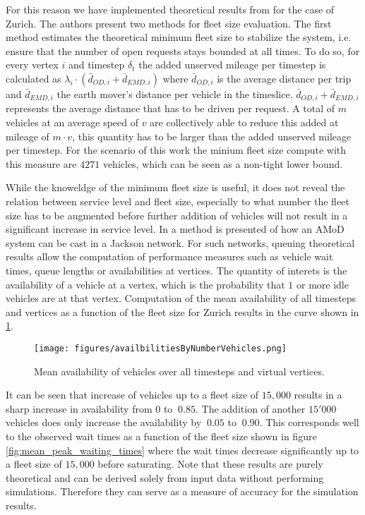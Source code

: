 For this reason we have implemented theoretical results from \citep{spieser2014toward} for the case of Zurich. The authors present two methods for fleet size evaluation. The first method estimates the theoretical minimum fleet size to stabilize the system, i.e. ensure that the number of open requests stays bounded at all times. To do so, for every vertex $i$ and timestep $\delta_t$ the added unserved mileage per timestep is calculated as $\lambda_i \cdot ( \bar{d}_{OD,i}  + \bar{d}_{EMD,i})$ where $\bar{d}_{OD,i}$ is the average distance per trip and  $\bar{d}_{EMD,i}$ the earth mover's distance per vehicle in the timeslice. $\bar{d}_{OD,i}  + \bar{d}_{EMD,i}$ represents the average distance that has to be driven per request. A total of $m$ vehicles at an average speed of $v$ are collectively able to reduce this added at mileage of $m \cdot v$, this quantity has to be larger than the added unserved mileage per timestep. For the scenario of this work the minium fleet size compute with this measure are $4271$ vehicles, which can be seen as a non-tight lower bound. 

While the knoweldge of the minimum fleet size is useful, it does not reveal the relation between service level and fleet size, especially to what number the fleet size has to be augmented before further addition of vehicles will not result in a significant increase in service level. In \citep{zhang2016control} a method is presented of how an AMoD system can be cast in a Jackson network. For such networks, queuing theoretical results allow the computation of performance measures such as vehicle wait times, queue lengths or availabilities at vertices. The quantity of interets is the availability of a vehicle at a vertex, which is the probability that $1$ or more idle vehicles are at that vertex. Computation of the mean availability of all timesteps and vertices as a function of the fleet size for Zurich results in the curve shown in \ref{fig:performanceavailability}.

\begin{figure}[h]
\begin{center}\texttt{[image: figures/availbilitiesByNumberVehicles.png]}\end{center}
\caption{Mean availability of vehicles over all timesteps and virtual vertices. }
\label{fig:performanceavailability}
\end{figure}

It can be seen that increase of vehicles up to a fleet size of $15,000$ results in a sharp increase in availability from $0$ to $~0.85$. The addition of another $15'000$ vehicles does only increase the availability by $~0.05$ to $~0.90$. This corresponds well to the observed wait times as a function of the fleet size shown in figure \ref{fig:mean_peak_waiting_times} where the wait times decrease significantly up to a fleet size of $15,000$ before saturating. Note that these results are purely theoretical and can be derived solely from input data without performing simulations. Therefore they can serve as a measure of accuracy for the simulation results.